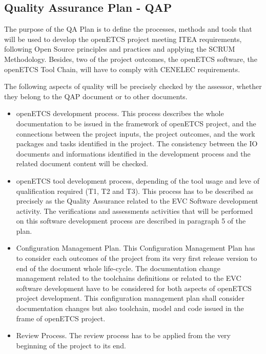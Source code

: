 \documentclass[openetcs]{template/openetcs_article}
\begin{document}
\subsection{Quality Assurance Plan - QAP}
The purpose of the QA Plan is to define the processes, methods and tools that will be used to develop the openETCS project meeting ITEA requirements, following
Open Source principles and practices and applying the SCRUM Methodology. Besides, two of the project outcomes, the openETCS software, the openETCS Tool Chain,
will have to comply with CENELEC requirements.

The following aspects of quality will be precisely checked by the assessor, whether they belong to the QAP document or to other documents.
\begin{itemize}
\item openETCS development process. This process describes the whole documentation to be issued in the framework of openETCS project, and the connections
between the project inputs, the project outcomes, and the work packages and tasks identified in the project. The consistency between the IO documents and
informations identified in the development process and the related document content will be checked.
\item openETCS tool development process, depending of the tool usage and leve of qualification required (T1, T2 and T3). This process has to be described as
precisely as the Quality Assurance related to the EVC Software development activity. The verifications and assessments activities that will be performed on
this software development process are described in paragraph 5 of the plan.
\item Configuration Management Plan. This Configuration Management Plan has to consider each outcomes of the project from its very first release version to end
of the document whole life-cycle. The documentation change management related to the toolchains definitions or related to the EVC software development have
to be considered for both aspects of openETCS project development. This configuration management plan shall consider documentation changes but also toolchain,
model and code issued in the frame of openETCS project.
\item Review Process. The review process has to be applied from the very beginning of the project to its end.
\end{itemize}
\end{document}
